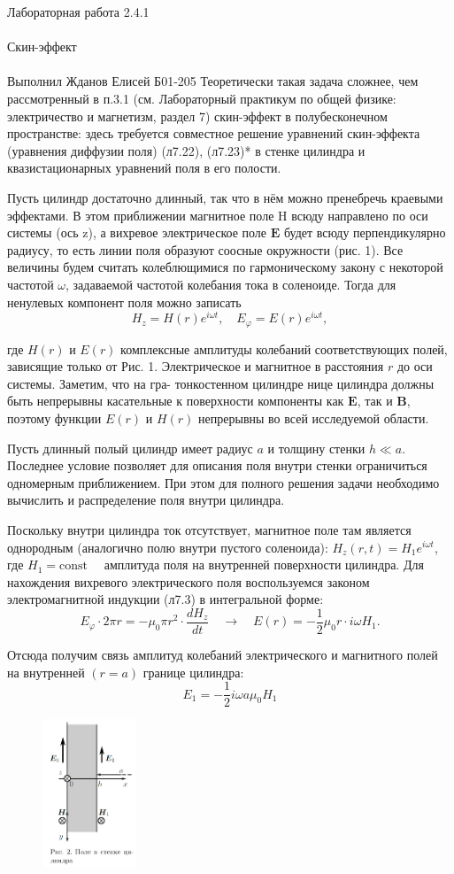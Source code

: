 \documentclass{astroedu-lab}
\begin{document}
\begin{problem}{\huge Лабораторная работа 2.4.1\\\\Скин-эффект\\\\Выполнил Жданов Елисей Б01-205}
Теоретически такая задача сложнее, чем рассмотренный в п.3.1 (см. Лабораторный практикум по общей физике: электричество и магнетизм, раздел 7) скин-эффект в полубесконечном пространстве: здесь требуется совместное решение уравнений скин-эффекта (уравнения диффузии поля) (л7.22), (л7.23)* в стенке цилиндра и квазистационарных уравнений поля в его полости.

Пусть цилиндр достаточно длинный, так что
в нём можно пренебречь краевыми эффектами. В
этом приближении магнитное поле H всюду направлено
по оси системы (ось z), а вихревое электрическое
поле $\boldsymbol{E}$ будет всюду перпендикулярно радиусу, то есть линии поля образуют соосные окружности (рис. 1). Все величины будем считать колеблющимися по гармоническому закону с некоторой частотой $\omega$, задаваемой частотой колебания тока в соленоиде. Тогда для ненулевых компонент поля можно записать
$$
H_z=H(r) e^{i \omega t}, \quad E_{\varphi}=E(r) e^{i \omega t},
$$

где $H(r)$ и $E(r)$ комплексные амплитуды колебаний соответствующих полей, зависящие только от Рис. 1. Электрическое и магнитное в расстояния $r$ до оси системы. Заметим, что на гра- тонкостенном цилиндре нице цилиндра должны быть непрерывны касательные к поверхности компоненты как $\boldsymbol{E}$, так и $\boldsymbol{B}$, поэтому функции $E(r)$ и $H(r)$ непрерывны во всей исследуемой области.

Пусть длинный полый цилиндр имеет радиус $a$ и толщину стенки $h \ll a$. Последнее условие позволяет для описания поля внутри стенки ограничиться одномерным приближением. При этом для полного решения задачи необходимо вычислить и распределение поля внутри цилиндра.

Поскольку внутри цилиндра ток отсутствует, магнитное поле там является однородным (аналогично полю внутри пустого соленоида): $H_z(r, t)=H_1 e^{i \omega t}$, где $H_1=\mathrm{const} \quad$ амплитуда поля на внутренней поверхности цилиндра. Для нахождения вихревого электрического поля воспользуемся законом электромагнитной индукции (л7.3) в интегральной форме:
$$
E_{\varphi} \cdot 2 \pi r=-\mu_0 \pi r^2 \cdot \frac{d H_z}{d t} \quad \rightarrow \quad E(r)=-\frac{1}{2} \mu_0 r \cdot i \omega H_1 .
$$

Отсюда получим связь амплитуд колебаний электрического и магнитного полей на внутренней $(r=a)$ границе цилиндра:
$$
E_1=-\frac{1}{2} i \omega a \mu_0 H_1
$$

\begin{figure}[!h]
	\centering
	\includegraphics[width=0.25\textwidth]{уст2.png}
	\label{fig:boiler}
\end{figure}


\end{problem}
\end{document}
